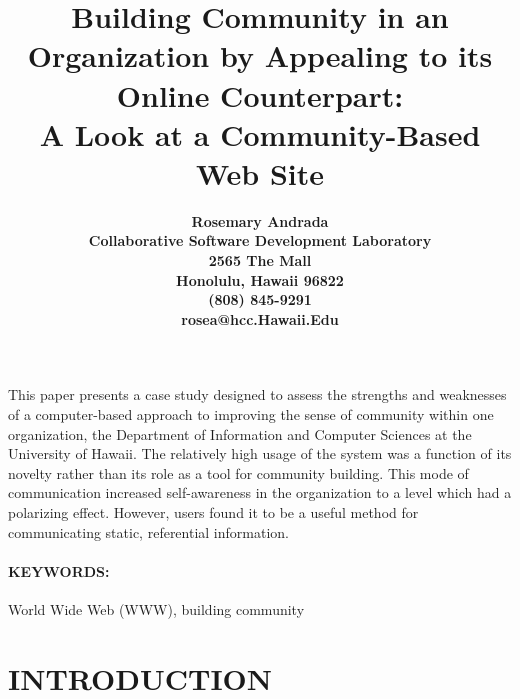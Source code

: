 



\title{Building Community in an Organization by Appealing to its Online
Counterpart:\\  
A Look at a Community-Based Web Site}

\author{
\bf{Rosemary Andrada} \\
Collaborative Software Development Laboratory \\
2565 The Mall \\
Honolulu, Hawaii 96822 \\
(808) 845-9291 \\
rosea@hcc.Hawaii.Edu}

\maketitle

\abstract 

This paper presents a case study designed to assess the strengths and
weaknesses of a computer-based approach to improving the sense of community
within one organization, the Department of Information and Computer Sciences at
the University of Hawaii.  The relatively high usage of the system was a
function of its novelty rather than its role as a tool for community building.
This mode of communication increased self-awareness in the organization to a
level which had a polarizing effect.  However, users found it to be a useful
method for communicating static, referential information.

\paragraph{KEYWORDS:} World Wide Web (WWW), building community

\section{INTRODUCTION}

